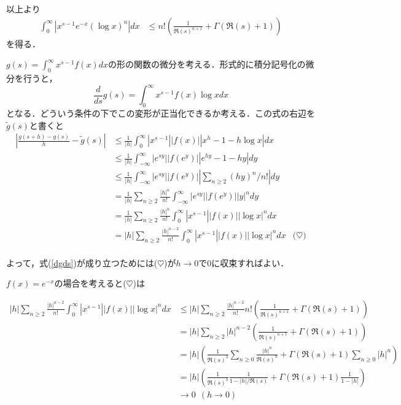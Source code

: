 \documentclass{jsarticle}
\theoremstyle{definition}
\begin{document}
以上より
\begin{align*}
\int_0^\infty |x^{s-1} e^{-x} (\log x)^n| dx &\le n!\left(\frac{1}{\Re(s)^{n+1}} + \Gamma(\Re(s)+1)\right)
\end{align*}
を得る．

$g(s) = \int_0^\infty x^{s-1} f(x) dx$の形の関数の微分を考える．形式的に積分記号化の微分を行うと，
\begin{equation}
\frac{d}{ds} g(s) = \int_0^\infty x^{s-1} f(x) \log x dx \label{dgds}
\end{equation}
となる．どういう条件の下でこの変形が正当化できるか考える．この式の右辺を$\tilde{g}(s)$と書くと
\begin{align*}
\left|\frac{g(s+h) - g(s)}{h} - \tilde{g}(s)\right| &\le \frac{1}{|h|} \int_0^\infty |x^{s-1}| |f(x)| |x^h-1-h\log x| dx \\
 &\le \frac{1}{|h|} \int_{-\infty}^\infty |e^{sy}| |f(e^y)| |e^{hy}-1-hy| dy \\
 &\le \frac{1}{|h|} \int_{-\infty}^\infty |e^{sy}| |f(e^y)| |\sum_{n\ge 2} (hy)^n / n!| dy \\
 &= \frac{1}{|h|} \sum_{n\ge 2} \frac{|h|^n}{n!} \int_{-\infty}^\infty |e^{sy}| |f(e^y)| |y|^n dy\\
 &= \frac{1}{|h|} \sum_{n\ge 2} \frac{|h|^n}{n!} \int_{0}^\infty |x^{s-1}| |f(x)| |\log x|^n dx \\
 &= |h| \sum_{n\ge 2} \frac{|h|^{n-2}}{n!} \int_{0}^\infty |x^{s-1}| |f(x)| |\log x|^n dx & \text{($\heartsuit$)} \\
\end{align*}

よって，式(\ref{dgds})が成り立つためには($\heartsuit$)が$h \to 0$で$0$に収束すればよい．

$f(x) = e^{-x}$の場合を考えると($\heartsuit$)は

\begin{align*}
|h| \sum_{n\ge 2} \frac{|h|^{n-2}}{n!} \int_{0}^\infty |x^{s-1}| |f(x)| |\log x|^n dx
&\le |h| \sum_{n\ge 2} \frac{|h|^{n-2}}{n!} n!\left(\frac{1}{\Re(s)^{n+1}} + \Gamma(\Re(s)+1)\right) \\
&= |h| \sum_{n\ge 2} |h|^{n-2} \left(\frac{1}{\Re(s)^{n+1}} + \Gamma(\Re(s)+1)\right) \\
&= |h| \left(\frac{1}{\Re(s)^3} \sum_{n\ge 0} \frac{|h|^n}{\Re(s)^n} + \Gamma(\Re(s)+1) \sum_{n\ge 0} |h|^n\right) \\
&= |h| \left(\frac{1}{\Re(s)^3} \frac{1}{1 - |h|/\Re(s)} + \Gamma(\Re(s)+1) \frac{1}{1-|h|}\right) \\
&\to 0\ \ (h \to 0)
\end{align*}
\end{document}
